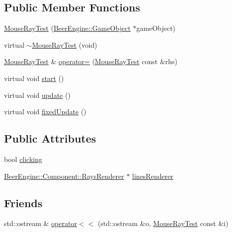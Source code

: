 \subsection*{Public Member Functions}
\begin{DoxyCompactItemize}
\item 
\mbox{\hyperlink{class_game_1_1_component_1_1_mouse_ray_test_a99877b8b30c5523e5ccd69998fcbf866}{Mouse\+Ray\+Test}} (\mbox{\hyperlink{class_beer_engine_1_1_game_object}{Beer\+Engine\+::\+Game\+Object}} $\ast$game\+Object)
\item 
virtual \mbox{\hyperlink{class_game_1_1_component_1_1_mouse_ray_test_ad20ea199276f520e5d18adf17cea8293}{$\sim$\+Mouse\+Ray\+Test}} (void)
\item 
\mbox{\hyperlink{class_game_1_1_component_1_1_mouse_ray_test}{Mouse\+Ray\+Test}} \& \mbox{\hyperlink{class_game_1_1_component_1_1_mouse_ray_test_adf6a006015555e1754ec1948bc10637b}{operator=}} (\mbox{\hyperlink{class_game_1_1_component_1_1_mouse_ray_test}{Mouse\+Ray\+Test}} const \&rhs)
\item 
virtual void \mbox{\hyperlink{class_game_1_1_component_1_1_mouse_ray_test_ae0d25b167dd28084ddd677b0593a54f3}{start}} ()
\item 
virtual void \mbox{\hyperlink{class_game_1_1_component_1_1_mouse_ray_test_af5bf853e25dd4e70386dfecd4dc7dab9}{update}} ()
\item 
virtual void \mbox{\hyperlink{class_game_1_1_component_1_1_mouse_ray_test_a71fe0d523b05a8d42c7c79101ea5ad18}{fixed\+Update}} ()
\end{DoxyCompactItemize}
\subsection*{Public Attributes}
\begin{DoxyCompactItemize}
\item 
bool \mbox{\hyperlink{class_game_1_1_component_1_1_mouse_ray_test_a526049c590ec69e6dcdbf127aaa0a244}{clicking}}
\item 
\mbox{\hyperlink{class_beer_engine_1_1_component_1_1_rays_renderer}{Beer\+Engine\+::\+Component\+::\+Rays\+Renderer}} $\ast$ \mbox{\hyperlink{class_game_1_1_component_1_1_mouse_ray_test_a0c6d4f0a878531fcfc83add4258b8eae}{lines\+Renderer}}
\end{DoxyCompactItemize}
\subsection*{Friends}
\begin{DoxyCompactItemize}
\item 
std\+::ostream \& \mbox{\hyperlink{class_game_1_1_component_1_1_mouse_ray_test_a779a38a659ea997f8f091bc720620380}{operator$<$$<$}} (std\+::ostream \&o, \mbox{\hyperlink{class_game_1_1_component_1_1_mouse_ray_test}{Mouse\+Ray\+Test}} const \&i)
\end{DoxyCompactItemize}
